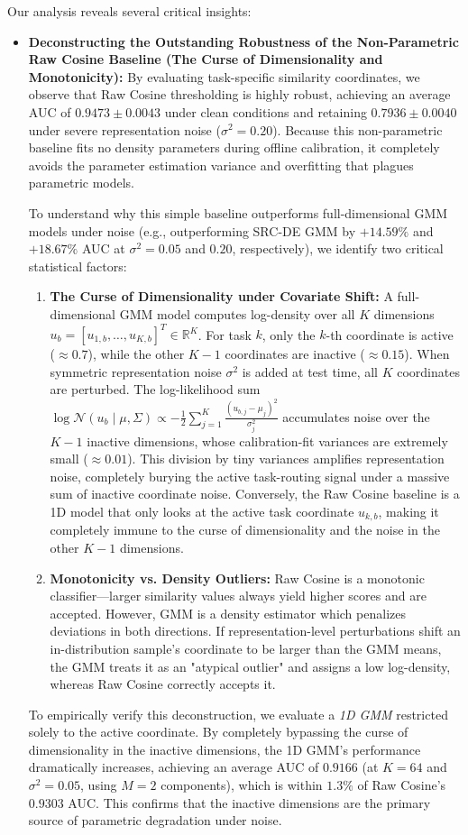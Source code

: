 Our analysis reveals several critical insights:
\begin{itemize}
    \item {\bf Deconstructing the Outstanding Robustness of the Non-Parametric Raw Cosine Baseline (The Curse of Dimensionality and Monotonicity):} By evaluating task-specific similarity coordinates, we observe that Raw Cosine thresholding is highly robust, achieving an average AUC of $0.9473 \pm 0.0043$ under clean conditions and retaining $0.7936 \pm 0.0040$ under severe representation noise ($\sigma^2=0.20$). Because this non-parametric baseline fits no density parameters during offline calibration, it completely avoids the parameter estimation variance and overfitting that plagues parametric models. 
    
    To understand why this simple baseline outperforms full-dimensional GMM models under noise (e.g., outperforming SRC-DE GMM by $+14.59\%$ and $+18.67\%$ AUC at $\sigma^2=0.05$ and $0.20$, respectively), we identify two critical statistical factors:
    \begin{enumerate}
        \item {\bf The Curse of Dimensionality under Covariate Shift:} A full-dimensional GMM model computes log-density over all $K$ dimensions $u_b = [u_{1,b}, \dots, u_{K,b}]^T \in \mathbb{R}^K$. For task $k$, only the $k$-th coordinate is active ($\approx 0.7$), while the other $K-1$ coordinates are inactive ($\approx 0.15$). When symmetric representation noise $\sigma^2$ is added at test time, all $K$ coordinates are perturbed. The log-likelihood sum $\log \mathcal{N}(u_b \mid \mu, \Sigma) \propto -\frac{1}{2} \sum_{j=1}^K \frac{(u_{b, j} - \mu_j)^2}{\sigma^2_j}$ accumulates noise over the $K-1$ inactive dimensions, whose calibration-fit variances are extremely small ($\approx 0.01$). This division by tiny variances amplifies representation noise, completely burying the active task-routing signal under a massive sum of inactive coordinate noise. Conversely, the Raw Cosine baseline is a 1D model that only looks at the active task coordinate $u_{k, b}$, making it completely immune to the curse of dimensionality and the noise in the other $K-1$ dimensions.
        \item {\bf Monotonicity vs. Density Outliers:} Raw Cosine is a monotonic classifier---larger similarity values always yield higher scores and are accepted. However, GMM is a density estimator which penalizes deviations in both directions. If representation-level perturbations shift an in-distribution sample's coordinate to be larger than the GMM means, the GMM treats it as an "atypical outlier" and assigns a low log-density, whereas Raw Cosine correctly accepts it.
    \end{enumerate}
    To empirically verify this deconstruction, we evaluate a {\em 1D GMM} restricted solely to the active coordinate. By completely bypassing the curse of dimensionality in the inactive dimensions, the 1D GMM's performance dramatically increases, achieving an average AUC of {\bf $0.9166$} (at $K=64$ and $\sigma^2=0.05$, using $M=2$ components), which is within $1.3\%$ of Raw Cosine's $0.9303$ AUC. This confirms that the inactive dimensions are the primary source of parametric degradation under noise.
    

\end{itemize}
